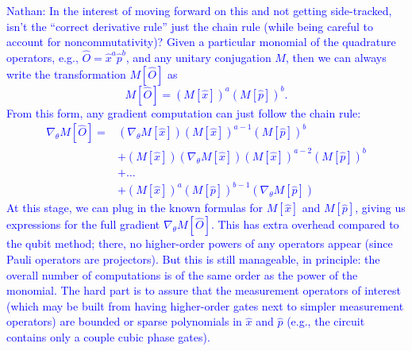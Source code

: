 \documentclass[aps,pra,10pt,onecolumn,notitlepage, groupedaddress,nofootinbib]{revtex4-1}
\theoremstyle{plain}
\newcommand{\nathan}[1]{\textcolor{blue}{Nathan: #1}}
\begin{document}
\nathan{In the interest of moving forward on this and not getting side-tracked, isn't the ``correct derivative rule'' just the chain rule (while being careful to account for noncommutativity)? Given a particular monomial of the quadrature operators, e.g., $\hat{O}=\hat{x}^a\hat{p}^b$, and any unitary conjugation $M$, then we can always write the transformation $M[\hat{O}]$ as
\begin{equation}
 M[\hat{O}] = \left(M[\hat{x}]\right)^a \left(M[\hat{p}]\right)^b.
\end{equation}
From this form, any gradient computation can just follow the chain rule:
\begin{align*}
 \nabla_\theta M[\hat{O}] 
 = &\left(\nabla_\theta M[\hat{x}]\right) \left(M[\hat{x}]\right)^{a-1}\left(M[\hat{p}]\right)^b \\
   & + \left(M[\hat{x}]\right)\left(\nabla_\theta M[\hat{x}]\right)\left(M[\hat{x}]\right)^{a-2} \left(M[\hat{p}]\right)^b \\
   & + \dots \\
   & +  \left(M[\hat{x}]\right)^a \left(M[\hat{p}]\right)^{b-1}\left(\nabla_\theta M[\hat{p}]\right)
\end{align*}
At this stage, we can plug in the known formulas for $M[\hat{x}]$ and $M[\hat{p}]$, giving us expressions for the full gradient $\nabla_\theta M[\hat{O}]$. This has extra overhead compared to the qubit method; there, no higher-order powers of any operators appear (since Pauli operators are projectors). But this is still manageable, in principle: the overall number of computations is of the same order as the power of the monomial. The hard part is to assure that the measurement operators of interest (which may be built from having higher-order gates next to simpler measurement operators) are bounded or sparse polynomials in $\hat{x}$ and $\hat{p}$ (e.g., the circuit contains only a couple cubic phase gates). 
}
 
\end{document}
